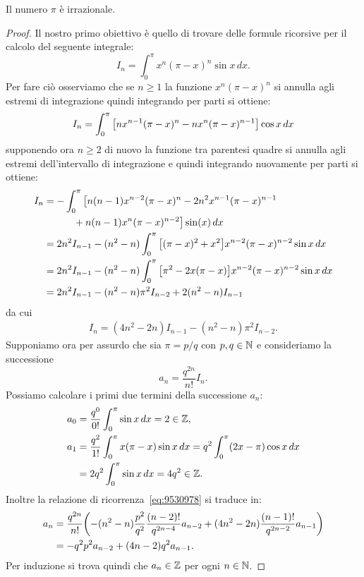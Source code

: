 \begin{theorem}[irrazionalità di $\pi$]
Il numero $\pi$ è irrazionale.
\end{theorem}
%
\begin{proof}
Il nostro primo obiettivo è quello di trovare delle formule
ricorsive per il calcolo del seguente integrale:
\[
  I_n = \int_0^\pi x^n (\pi-x)^n \sin x\, dx.
\]
Per fare ciò osserviamo che se $n\ge 1$ la funzione $x^n (\pi-x)^n$ si
annulla agli estremi di integrazione quindi integrando per parti
 si ottiene:
\[
  I_n = \int_0^\pi {\left[ n x^{n-1}(\pi-x)^n - n x^n (\pi-x)^{n-1} \right]} \cos x\, dx
\]
supponendo ora $n\ge 2$ di nuovo la funzione tra parentesi quadre si annulla
agli estremi dell'intervallo di integrazione e quindi integrando nuovamente
per parti si ottiene:
\begin{align*}
  I_n &= -\int_0^\pi \big[n(n-1) x^{n-2}(\pi-x)^n
    - 2n^2 x^{n-1}(\pi-x)^{n-1} \\
  &\qquad\quad   + n(n-1) x^n(\pi-x)^{n-2}\big] \sin(x)\, dx \\
  &= 2n^2 I_{n-1} - (n^2-n) \int_0^\pi {\left[ (\pi-x)^2 + x^2 \right]}x^{n-2}(\pi-x)^{n-2} \sin x\, dx \\
  &= 2n^2 I_{n-1} - (n^2-n) \int_0^\pi {\left[ \pi^2 - 2x(\pi-x) \right]}x^{n-2}(\pi-x)^{n-2}\sin x\, dx \\
  &= 2n^2 I_{n-1} - (n^2-n) \pi^2 I_{n-2} + 2(n^2-n) I_{n-1}
\end{align*}
da cui
\begin{align}\label{eq:9530978}
   I_n = (4n^2-2n)I_{n-1} -(n^2-n)\pi^2 I_{n-2}.
\end{align}
Supponiamo ora per assurdo che sia $\pi = p/q$ con $p,q\in \mathbb N$ e consideriamo
la successione
\[
   a_n = \frac{q^{2n}}{n!} I_n.
\]
Possiamo calcolare i primi due termini della successione $a_n$:
\begin{align*}
  a_0 &= \frac{q^0}{0!}\int_0^\pi \sin x\, dx
    = 2 \in \mathbb Z, \\
  a_1 &= \frac{q^2}{1!}\int_0^\pi x(\pi -x)\sin x\, dx
   = q^2 \int_0^\pi (2x - \pi)\cos x\, dx \\
   &= 2q^2 \int_0^\pi \sin x\, dx
   = 4q^2 \in \mathbb Z.
\end{align*}
Inoltre la relazione di ricorrenza~\eqref{eq:9530978}
si traduce in:
\begin{align*}
  a_n &= \frac{q^{2n}}{n!}{\left( -(n^2-n)\frac{p^2}{q^2} \frac{(n-2)!}{q^{2n-4}}a_{n-2}
  + (4n^2-2n) \frac{(n-1)!}{q^{2n-2}}a_{n-1} \right)} \\
  &= - q^2 p^2 a_{n-2} + (4n-2)q^2 a_{n-1}.
\end{align*}
Per induzione si trova quindi che $a_n \in \mathbb Z$ per ogni $n\in \mathbb N$.


\end{proof}
